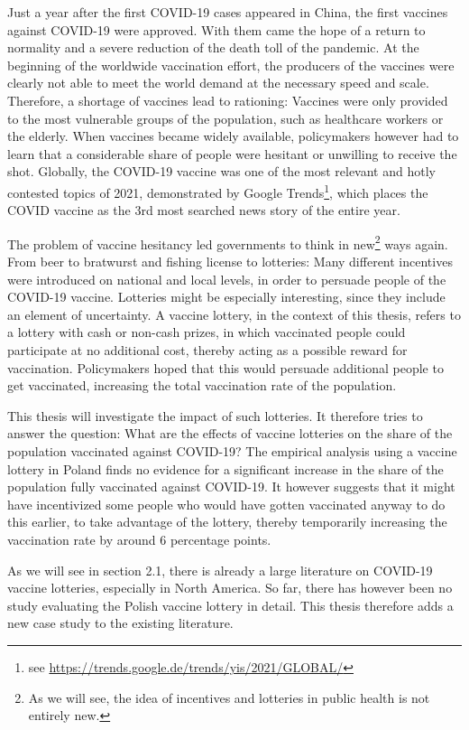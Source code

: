 \documentclass{scrbook}
\begin{document}
Just a year after the first COVID-19 cases appeared in China, the first
vaccines against COVID-19 were approved. With them came the hope of a
return to normality and a severe reduction of the death toll of the
pandemic. At the beginning of the worldwide vaccination effort, the
producers of the vaccines were clearly not able to meet the world demand
at the necessary speed and scale. Therefore, a shortage of vaccines lead
to rationing: Vaccines were only provided to the most vulnerable groups
of the population, such as healthcare workers or the elderly. When
vaccines became widely available, policymakers however had to learn that
a considerable share of people were hesitant or unwilling to receive the
shot. Globally, the COVID-19 vaccine was one of the most relevant and
hotly contested topics of 2021, demonstrated by Google
Trends\footnote{see \url{https://trends.google.de/trends/yis/2021/GLOBAL/}},
which places the COVID vaccine as the 3rd most searched news story of
the entire year.

The problem of vaccine hesitancy led governments to think in
new\footnote{As we will see, the idea of incentives and lotteries in public health is not entirely new.}
ways again. From beer to bratwurst and fishing license to lotteries:
Many different incentives were introduced on national and local levels,
in order to persuade people of the COVID-19 vaccine. Lotteries might be
especially interesting, since they include an element of uncertainty. A
vaccine lottery, in the context of this thesis, refers to a lottery with
cash or non-cash prizes, in which vaccinated people could participate at
no additional cost, thereby acting as a possible reward for vaccination.
Policymakers hoped that this would persuade additional people to get
vaccinated, increasing the total vaccination rate of the population.

This thesis will investigate the impact of such lotteries. It therefore
tries to answer the question: What are the effects of vaccine lotteries
on the share of the population vaccinated against COVID-19? The
empirical analysis using a vaccine lottery in Poland finds no evidence
for a significant increase in the share of the population fully
vaccinated against COVID-19. It however suggests that it might have
incentivized some people who would have gotten vaccinated anyway to do
this earlier, to take advantage of the lottery, thereby temporarily
increasing the vaccination rate by around 6 percentage points.

As we will see in section 2.1, there is already a large literature on
COVID-19 vaccine lotteries, especially in North America. So far, there
has however been no study evaluating the Polish vaccine lottery in
detail. This thesis therefore adds a new case study to the existing
literature.
\end{document}
